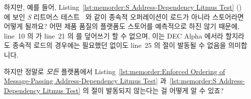하지만, 예를 들어,
Listing~\ref{lst:memorder:S Address-Dependency Litmus Test}
() 에 보인 \emph{S} 리트머스
테스트~\cite{JadeAlglave2011ppcmem} 와 같이 종속적 오퍼레이션이 로드가 아니라
스토어라면 어떻게 될까요?
어떤 제품 품질의 플랫폼도 스토어를 예측적으로 하진 않기 때문에, line~10 의
 가 line~21 의  를 덮어쓰기 할 수 없으며,
이는 DEC Alpha 에서라 할지라도 종속적 로드의 경우에는 필요했던
 없이도 line~25 의  절이 발동될 수 없음을
의미합니다.

\QuickQuiz{}
	하지만 정말로 \emph{모든} 플랫폼에서
	Listing~\ref{lst:memorder:Enforced Ordering of Message-Passing Address-Dependency Litmus Test}
	과~\ref{lst:memorder:S Address-Dependency Litmus Test} 의 
	절이 발동되지 않는다는 걸 어떻게 알 수 있죠?
	\iffalse


